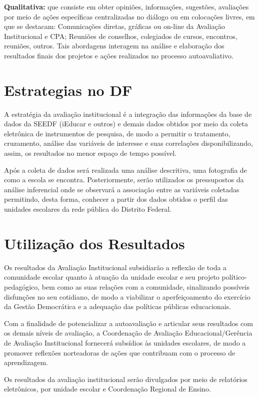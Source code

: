 \documentclass[final]{beamer}
\begin{document}
\begin{poster}
\textbf{Qualitativa:} que consiste em obter opiniões, informações, sugestões, avaliações por meio de ações específicas centralizadas no diálogo ou em colocações livres, em que se destacam:
Comunicações diretas, gráficas ou on-line da Avaliação Institucional e CPA; 
Reuniões de conselhos, colegiados de cursos, encontros, reuniões, outros. 
Tais abordagens interagem na análise e elaboração dos resultados finais dos projetos e ações realizados no processo autoavaliativo.


\section{Estrategias no DF}
A estratégia da avaliação institucional é a integração das informações da base de dados da SEEDF (iEducar e outros) e demais dados obtidos por meio da coleta eletrônica de instrumentos de pesquisa, de modo a permitir o tratamento, cruzamento, análise das variáveis de interesse e suas correlações disponibilizando, assim, os resultados no menor espaço de tempo possível.

Após a coleta de dados será realizada uma análise descritiva, uma fotografia de como a escola se encontra. Posteriormente, serão utilizados os pressupostos da análise inferencial onde se observará a associação entre as variáveis coletadas permitindo, desta forma, conhecer a partir dos dados obtidos o perfil das unidades escolares da rede pública do Distrito Federal.




\section{Utilização dos Resultados}
Os resultados da Avaliação Institucional subsidiarão a reflexão de toda a comunidade escolar quanto à atuação da unidade escolar e seu projeto político-pedagógico, bem como as suas relações com a comunidade, sinalizando possíveis disfunções no seu cotidiano, de modo a viabilizar o aperfeiçoamento do exercício da Gestão Democrática e a adequação das políticas públicas educacionais.

Com a finalidade de potencializar a autoavaliação e articular seus resultados com os demais níveis de avaliação, a Coordenação de Avaliação Educacional/Gerência de Avaliação Institucional fornecerá subsídios às unidades escolares, de modo a promover reflexões norteadoras de ações que contribuam com o processo de aprendizagem.

Os resultados da avaliação institucional serão divulgados por meio de relatórios eletrônicos, por unidade escolar e Coordenação Regional de Ensino.
























%
%

\end{poster}
\end{document}
